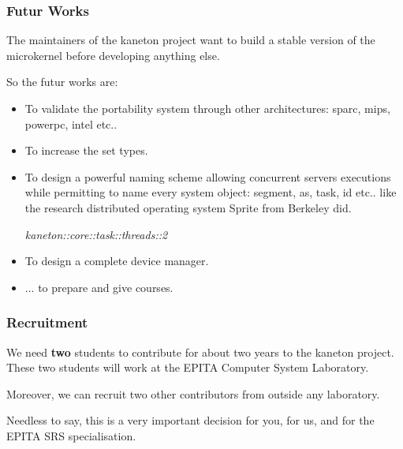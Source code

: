 
\begin{frame}
  \frametitle{Futur Works}

  The maintainers of the kaneton project want to build a stable version
  of the microkernel before developing anything else.

  \nl

  So the futur works are:

  \begin{itemize}[<+->]
    \item
      To validate the portability system through other architectures:
      sparc, mips, powerpc, intel etc..
    \item
      To increase the set types.
    \item
      To design a powerful naming scheme allowing concurrent
      servers executions while permitting to name every system object:
      segment, as, task, id etc.. like the research distributed operating
      system Sprite from Berkeley did.

      \nl

      \textit{kaneton::core::task::threads::2}
    \item
      To design a complete device manager.
    \item
      ... to prepare and give courses.
  \end{itemize}
\end{frame}


\begin{frame}
  \frametitle{Recruitment}

  We need \textbf{two} students to contribute for about two years to
  the kaneton project. These two students will work at the EPITA Computer
  System Laboratory.

  \nl

  Moreover, we can recruit two other contributors from outside any laboratory.

  \nl

  Needless to say, this is a very important decision for you, for us,
  and for the EPITA SRS specialisation.
\end{frame}


